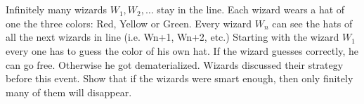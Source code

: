 \documentclass[]{article}
\newcommand{\Rel}{\mathcal{R}}
\newcommand{\N}{\mathbb{N}}
\newcommand{\Q}{\mathbb{Q}}
\newtheorem{theorem}{Theorem}
\begin{document}






\newpage
\section{}
Infinitely many wizards $W_1, W_2,\dots$ stay in the line.
Each wizard wears a hat of one the three colors: Red, Yellow or Green. 
Every wizard $W_n$ can see the hats of all the next wizards in line (i.e. Wn+1, Wn+2, etc.) 
Starting  with  the  wizard $W_1$ every one has to guess the color of his own hat. 
If the wizard guesses correctly, he can go free. Otherwise he got dematerialized. 
Wizards  discussed  their  strategy  before  this  event. 
Show that if the wizards were smart enough, then only finitely many of them will disappear.
\end{document}
